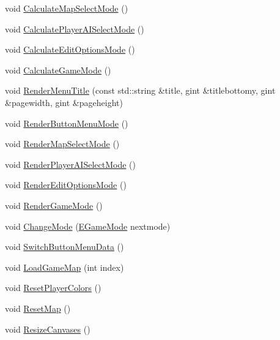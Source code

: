\begin{DoxyCompactItemize}
void \hyperlink{classCApplicationData_a3c481d6483d165488596144a4bcf95cf}{Calculate\+Map\+Select\+Mode} ()
\item 
void \hyperlink{classCApplicationData_afbd3d397ba6bb36452458cf8f62ef9dc}{Calculate\+Player\+A\+I\+Select\+Mode} ()
\item 
void \hyperlink{classCApplicationData_a9fa1176cd629742424f29ab20c212142}{Calculate\+Edit\+Options\+Mode} ()
\item 
void \hyperlink{classCApplicationData_a782d7204356ef9560deedd54320d4f16}{Calculate\+Game\+Mode} ()
\item 
void \hyperlink{classCApplicationData_a548c5924a281c7e226fd7cac44e59920}{Render\+Menu\+Title} (const std\+::string \&title, gint \&titlebottomy, gint \&pagewidth, gint \&pageheight)
\item 
void \hyperlink{classCApplicationData_a4766e5533d32e4194816f5a4ea838bd3}{Render\+Button\+Menu\+Mode} ()
\item 
void \hyperlink{classCApplicationData_a72fff3a266be49b3e9f323dcfe545923}{Render\+Map\+Select\+Mode} ()
\item 
void \hyperlink{classCApplicationData_a7d46646402ac95a056456e4a3bb353ed}{Render\+Player\+A\+I\+Select\+Mode} ()
\item 
void \hyperlink{classCApplicationData_a7da1dd0b9a8d7c68d8df5f60b4e94189}{Render\+Edit\+Options\+Mode} ()
\item 
void \hyperlink{classCApplicationData_ae5ba05c6fb7e6f0414c26f0b44bc842c}{Render\+Game\+Mode} ()
\item 
void \hyperlink{classCApplicationData_aee18c113e9a0acb3cad3d63eb19de71b}{Change\+Mode} (\hyperlink{classCApplicationData_ac8ac37a4c8bb871036fbbdc6a072e403}{E\+Game\+Mode} nextmode)
\item 
void \hyperlink{classCApplicationData_a2a464fd480c791ab13a1b1ca855e4578}{Switch\+Button\+Menu\+Data} ()
\item 
void \hyperlink{classCApplicationData_a89af0c7917be766575720e5ac79c8d2d}{Load\+Game\+Map} (int index)
\item 
void \hyperlink{classCApplicationData_a46653e8a3ed079f3921ec0257e49eb89}{Reset\+Player\+Colors} ()
\item 
void \hyperlink{classCApplicationData_a18ae4aed31d9ef2416059e66babb05b0}{Reset\+Map} ()
\item 
void \hyperlink{classCApplicationData_ad8b16ccb099b4996ce9fee34a407c091}{Resize\+Canvases} ()
\end{DoxyCompactItemize}
